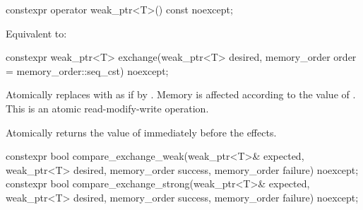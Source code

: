 %
\begin{itemdecl}
constexpr operator weak_ptr<T>() const noexcept;
\end{itemdecl}

\begin{itemdescr}
\pnum
\effects
Equivalent to: 
\end{itemdescr}

%
\begin{itemdecl}
constexpr weak_ptr<T> exchange(weak_ptr<T> desired,
                               memory_order order = memory_order::seq_cst) noexcept;
\end{itemdecl}

\begin{itemdescr}
\pnum
\effects
Atomically replaces  with 
as if by .
Memory is affected according to the value of .
This is an atomic read-modify-write operation.

\pnum
\returns
Atomically returns the value of  immediately before the effects.
\end{itemdescr}

%
\begin{itemdecl}
constexpr bool compare_exchange_weak(weak_ptr<T>& expected, weak_ptr<T> desired,
                                     memory_order success, memory_order failure) noexcept;
constexpr bool compare_exchange_strong(weak_ptr<T>& expected, weak_ptr<T> desired,
                                       memory_order success, memory_order failure) noexcept;
\end{itemdecl}

